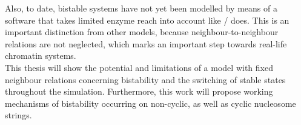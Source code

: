         Also, to date, bistable systems have not yet been modelled by means of a software that takes limited enzyme reach into account like \ed/ does. This is an important distinction from other models, because neighbour-to-neighbour relations are not neglected, which marks an important step towards real-life chromatin systems.\\

        This thesis will show the potential and limitations of a model with fixed neighbour relations concerning bistability and the switching of stable states throughout the simulation. Furthermore, this work will propose working mechanisms of bistability occurring on non-cyclic, as well as cyclic nucleosome strings.
%
%
